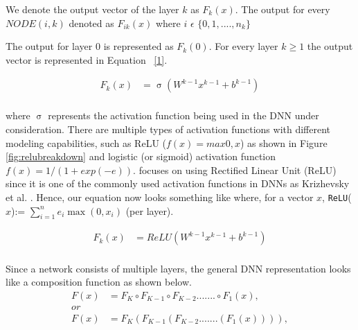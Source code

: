 We denote the output vector of the layer $k$ as $F_k(x)$.
The output for every $NODE(i,k)$ denoted as $F_{ik}(x)$ where $i$ $\epsilon$ $\{0,1,....,n_k\}$ 

The output for layer 0 is represented as $F_k(0)$.
For every layer $k \geq 1$ the output vector is represented in Equation ~\ref{1}. 

\begin{equation}
\label{1}
\begin{aligned}
F_k(x) &= \upsigma(W^{k-1}x^{k-1} + b^{k-1}) \\
\end{aligned}
\end{equation}

where $\upsigma$ represents the activation function being used in the DNN under consideration. 
There are multiple types of activation functions with different modeling capabilities, such as ReLU ($f(x) = max {0,x}$) as shown in Figure 	\ref{fig:relubreakdown} and logistic (or sigmoid) activation function $f(x)=1/(1+ exp(-e))$.
\tool focuses on using Rectified Linear Unit (ReLU) since it is one of the commonly used activation functions in \ac{DNN}s as Krizhevsky et al. \cite{10.1145/3065386}. 
Hence, our equation now looks something like where, for a vector $x$, \texttt{ReLU}($x$):= $\sum_{i=1}^{n} e_{i}\max(0, x_{i})$ (per layer).



\begin{equation}
\label{2}
\begin{aligned}
F_k(x) &= ReLU(W^{k-1}x^{k-1} + b^{k-1}) \\
\end{aligned}
\end{equation}

Since a network consists of multiple layers, the general \ac{DNN} representation looks like a composition function as shown below. 
\begin{equation}
\label{3}
	\begin{aligned}
	F(x) &= F_K \circ F_{K-1} \circ F_{K-2} ....... \circ F_1(x),    \\
	or \\
	F(x) &= F_K ( F_{K-1}( F_{K-2} .......  (F_1(x)))),    \\
	\end{aligned}
\end{equation}


